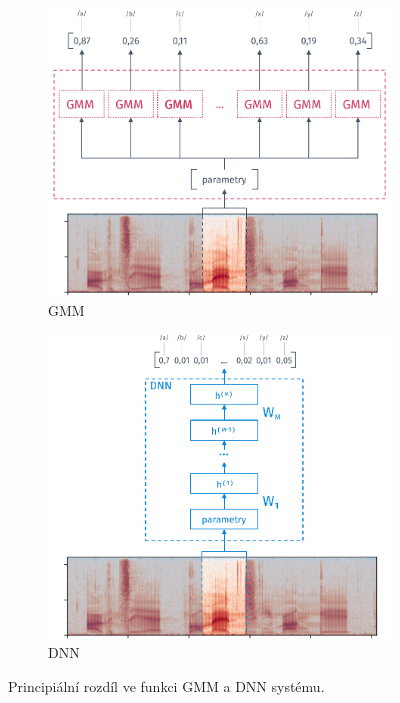 \begin{figure}[htpb]
  \centering
  \begin{subfigure}[b]{0.4\textwidth}
    \includegraphics[width=\textwidth]{./ch4-asr/img/hmm-gmm.pdf}
    \caption{GMM}
    \label{fig:asr:acoustic:dnn:asr:diff:dnn}
  \end{subfigure}
  \begin{subfigure}[b]{0.4\textwidth}
    \includegraphics[width=\textwidth]{./ch4-asr/img/hmm-dnn.pdf}
    \caption{DNN}
    \label{fig:asr:acoustic:dnn:asr:diff:dnn}
  \end{subfigure}
  \caption{Principiální rozdíl ve funkci GMM a DNN systému.}
  \label{fig:asr:acoustic:dnn:asr:diff}
\end{figure}


